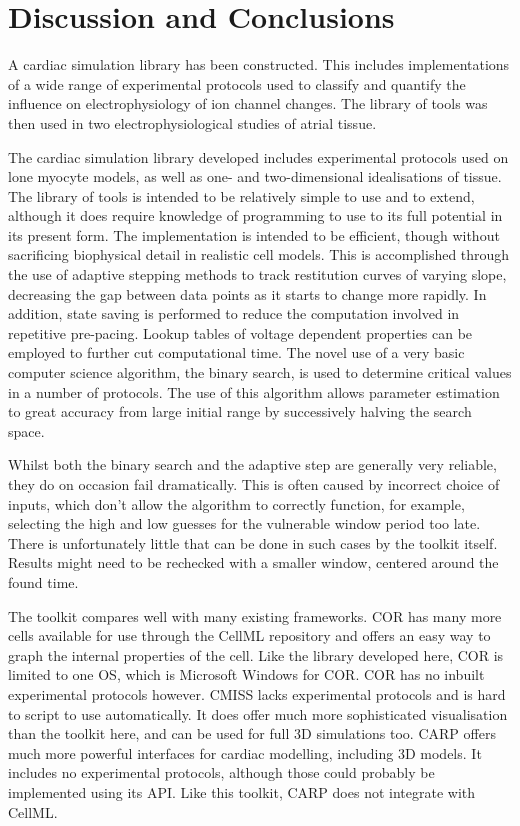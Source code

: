 \section{Discussion and Conclusions}

A cardiac simulation library has been constructed.
This includes implementations of a wide range of experimental protocols used to
classify and quantify the influence on electrophysiology of ion channel changes.
The library of tools was then used in two electrophysiological studies of atrial
tissue.

The cardiac simulation library developed includes experimental protocols used on
lone myocyte models, as well as one- and two-dimensional idealisations of
tissue.
The library of tools is intended to be relatively simple to use and to extend,
although it does require knowledge of programming to use to its full potential
in its present form.
The implementation is intended to be efficient, though without sacrificing
biophysical detail in realistic cell models.
This is accomplished through the use of adaptive stepping methods to track
restitution curves of varying slope, decreasing the gap between data points as
it starts to change more rapidly.
In addition, state saving is performed to reduce the computation involved in
repetitive pre-pacing.
Lookup tables of voltage dependent properties can be employed to further cut
computational time.
The novel use of a very basic computer science algorithm, the binary search, is
used to determine critical values in a number of protocols.
The use of this algorithm allows parameter estimation to great accuracy from
large initial range by successively halving the search space.

Whilst both the binary search and the adaptive step are generally very reliable,
they do on occasion fail dramatically.
This is often caused by incorrect choice of inputs, which don't allow the
algorithm to correctly function, for example, selecting the high and low guesses
for the vulnerable window period too late.
There is unfortunately little that can be done in such cases by the toolkit
itself.
Results might need to be rechecked with a smaller window, centered around the
found time.

The toolkit compares well with many existing frameworks.
COR has many more cells available for use through the CellML repository and
offers an easy way to graph the internal properties of the cell.
Like the library developed here, COR is limited to one OS, which is Microsoft
Windows for COR.
COR has no inbuilt experimental protocols however.
CMISS lacks experimental protocols and is hard to script to use automatically.
It does offer much more sophisticated visualisation than the toolkit here, and
can be used for full 3D simulations too.
CARP offers much more powerful interfaces for cardiac modelling, including 3D
models.
It includes no experimental protocols, although those could probably be
implemented using its API.
Like this toolkit, CARP does not integrate with CellML.

